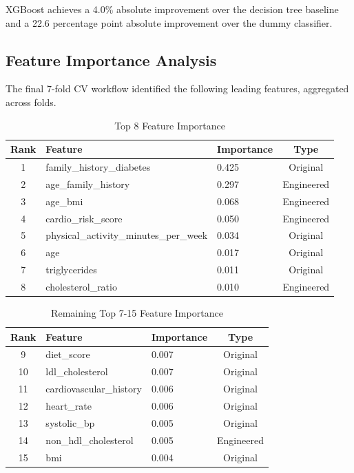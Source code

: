 \documentclass[a4paper,11pt]{article}
\begin{document}
XGBoost achieves a 4.0\% absolute improvement over the decision tree baseline and a 22.6 percentage point absolute improvement over the dummy classifier.

\subsection{Feature Importance Analysis}

The final 7-fold CV workflow identified the following leading features, aggregated across folds.

\begin{table}[H]
\centering
\caption{Top 8 Feature Importance}
\label{tab:importance_top8}
\small
\setlength{\tabcolsep}{4pt}
\begin{tabular}{cllc}
\toprule
\textbf{Rank} & \textbf{Feature} & \textbf{Importance} & \textbf{Type} \\
\midrule
1 & family\_history\_diabetes & 0.425 & Original \\
2 & age\_family\_history & 0.297 & Engineered \\
3 & age\_bmi & 0.068 & Engineered \\
4 & cardio\_risk\_score & 0.050 & Engineered \\
5 & physical\_activity\_minutes\_per\_week & 0.034 & Original \\
6 & age & 0.017 & Original \\
7 & triglycerides & 0.011 & Original \\
8 & cholesterol\_ratio & 0.010 & Engineered \\
\bottomrule
\end{tabular}
\end{table}

\begin{table}[H]
\centering
\caption{Remaining Top 7-15 Feature Importance}
\label{tab:importance_rest}
\small
\setlength{\tabcolsep}{4pt}
\begin{tabular}{cllc}
\toprule
\textbf{Rank} & \textbf{Feature} & \textbf{Importance} & \textbf{Type} \\
\midrule
9 & diet\_score & 0.007 & Original \\
10 & ldl\_cholesterol & 0.007 & Original \\
11 & cardiovascular\_history & 0.006 & Original \\
12 & heart\_rate & 0.006 & Original \\
13 & systolic\_bp & 0.005 & Original \\
14 & non\_hdl\_cholesterol & 0.005 & Engineered \\
15 & bmi & 0.004 & Original \\
\bottomrule
\end{tabular}
\end{table}
\end{document}
